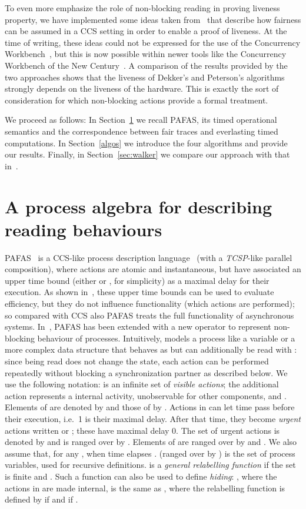 \documentclass[copyright,creativecommons]{eptcs}
\begin{document}
To even more emphasize the role of non-blocking reading in proving
liveness property, we have implemented some ideas taken
from~\cite{Walker89}
that describe how fairness can be assumed in a CCS setting in order to
enable a proof of liveness. At the time of writing, these ideas could not
be expressed for the use of the Concurrency
Workbench~\cite{CleavelandPS89}, but this is now possible within newer
tools like the Concurrency Workbench of the New Century~\cite{CLS00}. A
comparison of the results provided by the two approaches shows that the
liveness of Dekker's and Peterson's algorithms strongly depends on the
liveness of the hardware. This is exactly the sort of consideration for
which non-blocking actions provide a formal treatment.

We proceed as follows: In Section~\ref{PAFAS-s} we recall PAFAS, its
timed operational semantics and the correspondence between fair traces and
everlasting timed computations. In Section~\ref{algos} we introduce the
four algorithms and provide our results. Finally, in
Section~\ref{sec:walker} we compare our approach with that
in~\cite{Walker89}.
\section{A process algebra for describing reading
behaviours}\label{PAFAS-s}
PAFAS~\cite{CVJ02} is a CCS-like process description language~\cite{Mil89}
(with a {\em TCSP}-like parallel composition), where actions are atomic and
instantaneous, but have associated an upper time bound (either  or ,
for simplicity) as a maximal delay for their execution. As shown
in~\cite{CVJ02}, these upper time bounds can be used to evaluate
efficiency, but they do not influence functionality (which actions are
performed); so compared with CCS also PAFAS treats the full functionality
of asynchronous systems. In~\cite{CDV08tr}, PAFAS has been extended with a
new operator  to represent non-blocking behaviour of processes.
Intuitively,  models a process like a
variable or a more complex data structure that behaves as  but can
additionally be read with : since being read
does not change the state, each action  can be performed
repeatedly without blocking a synchronization partner as described below.
We use the following notation:  is an infinite set of \emph{visible
actions}; the additional action  represents a internal activity,
unobservable for other components, and . Elements of
 are denoted by  and those of  by
. Actions in  can let time  pass before their
execution, i.e.\ 1 is their maximal delay. After that time, they become
\emph{urgent} actions written  or ; these
have maximal delay 0. The set of urgent actions is denoted by
 and is ranged over by
. Elements of  are ranged over by  and . We also assume
that, for any , when time elapses .  (ranged over by ) is the set of
process variables, used for recursive definitions.  is a {\it general relabelling function} if the set  is finite and . Such a function can also be used to
define {\em hiding}: , where the actions in  are made internal, is
the same as , where the relabelling function  is defined
by  if  and  if
. 
\end{document}
